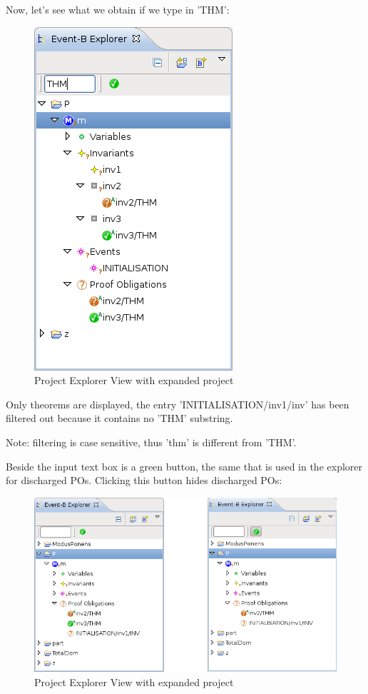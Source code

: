 Now, let's see what we obtain if we type in 'THM': 

\begin{figure}[!h]
\begin{center}
	\includegraphics{img/reference/ref_01_project_explorer7.png}
	\caption{Project Explorer View with expanded project}
	\label{fig_ref_01_project_explorer7}
\end{center}
\end{figure}

Only theorems are displayed, the entry 'INITIALISATION/inv1/inv' has been filtered out because it contains no 'THM' substring.

Note: filtering is case sensitive, thus 'thm' is different from 'THM'.

Beside the input text box is a green button, the same that is used in the explorer for discharged POs. Clicking this button hides discharged POs: 

\begin{figure}[!h]
\begin{center}
	\includegraphics{img/reference/ref_01_project_explorer8.png}
	\caption{Project Explorer View with expanded project}
	\label{fig_ref_01_project_explorer8}
\end{center}
\end{figure}

